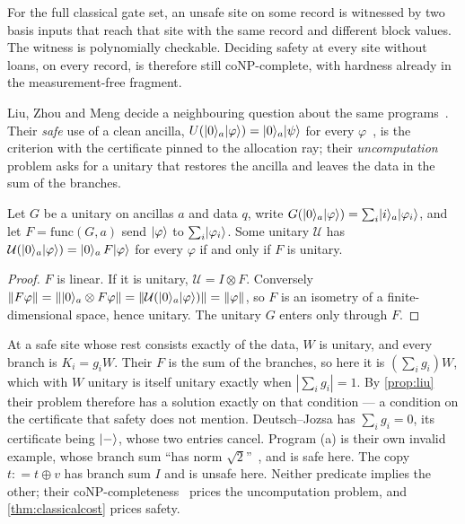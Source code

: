 \documentclass[acmsmall,screen,review,anonymous,nonacm]{acmart}
\begin{document}
For the full classical gate set, an unsafe site on some record is
witnessed by two basis inputs that reach that site with the same record
and different block values. The witness is polynomially checkable.
Deciding safety at every site without loans, on every record, is therefore still
coNP-complete, with hardness already in the measurement-free fragment.

Liu, Zhou and Meng decide a neighbouring question about the same
programs~\cite{Liu2026Uncomputation}. Their \emph{safe} use of a clean
ancilla, $U(\lvert 0 \rangle_a\lvert \varphi \rangle) = \lvert 0 \rangle_a\lvert \psi \rangle$ for every
$\varphi$~\cite[Eq.~(1)]{Liu2026Uncomputation}, is the criterion with the
certificate pinned to the allocation ray; their \emph{uncomputation} problem
asks for a unitary that restores the ancilla and leaves the data in the sum
of the branches.

\begin{proposition}\label{prop:liu}
Let $G$ be a unitary on ancillas $a$ and data $q$, write
$G(\lvert 0 \rangle_a\lvert \varphi \rangle) = \sum_i \lvert i \rangle_a\lvert \varphi_i \rangle$, and let
$F = \mathrm{func}(G,a)$ send $\lvert \varphi \rangle$ to $\sum_i \lvert \varphi_i \rangle$. Some
unitary $\mathcal U$ has $\mathcal U(\lvert 0 \rangle_a\lvert \varphi \rangle) =
\lvert 0 \rangle_a\,F\lvert \varphi \rangle$ for every $\varphi$ if and only
if $F$ is unitary.
\end{proposition}
\begin{proof}
$F$ is linear. If it is unitary, $\mathcal U = I \otimes F$. Conversely
$\lVert F\varphi\rVert = \lVert \lvert 0 \rangle_a \otimes F\varphi\rVert =
\lVert \mathcal U(\lvert 0 \rangle_a\lvert \varphi \rangle)\rVert = \lVert\varphi\rVert$, so
$F$ is an isometry of a finite-dimensional space, hence unitary. The
unitary $G$ enters only through $F$.
\end{proof}

At a safe site whose rest consists exactly of the data, $W$ is unitary, and
every branch is $K_i = g_iW$. Their $F$ is the sum of the branches, so here it
is $(\sum_i g_i)W$, which with $W$ unitary is itself unitary exactly when
$|\sum_i g_i| = 1$. By \cref{prop:liu} their problem therefore has a solution
exactly on that condition --- a condition on the certificate that safety does
not mention. Deutsch--Jozsa has $\sum_i g_i = 0$, its certificate being
$\lvert - \rangle$, whose two entries cancel.
Program (a) is their own invalid example, whose branch sum ``has norm
$\sqrt2$''~\cite[\S3.1]{Liu2026Uncomputation}, and is safe here. The copy
$t \mathrel{{:}{=}} t \oplus v$ has branch sum $I$ and is unsafe here.
Neither predicate implies the other; their
coNP-completeness~\cite[Cor.~3.1]{Liu2026Uncomputation} prices the
uncomputation problem, and \cref{thm:classicalcost} prices safety.
\end{document}
